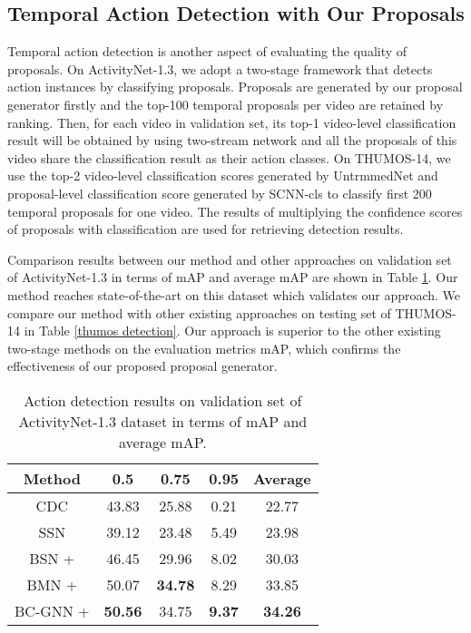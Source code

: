\documentclass[runningheads]{llncs}
\begin{document}
\subsection{Temporal Action Detection with Our Proposals}
Temporal action detection is another aspect of evaluating the quality of proposals. On ActivityNet-1.3, we adopt a two-stage framework that detects action instances by classifying proposals. Proposals are generated by our proposal generator firstly and the top-100 temporal proposals per video are retained by ranking. Then, for each video in validation set, its top-1 video-level classification result will be obtained by using two-stream network \cite{anet_cls} and all the proposals of this video share the classification result as their action classes. On THUMOS-14, we use the top-2 video-level classification scores generated by UntrmmedNet \cite{untrimmednets} and proposal-level classification score generated by SCNN-cls to classify first 200 temporal proposals for one video. The results of multiplying the confidence scores of proposals with classification are used for retrieving detection results.

Comparison results between our method and other approaches on validation set of ActivityNet-1.3 in terms of mAP and average mAP are shown in Table \ref{anet_detection}. Our method reaches state-of-the-art on this dataset which validates our approach. We compare our method with other existing approaches on testing set of THUMOS-14 in Table \ref{thumos detection}. Our approach is superior to the other existing two-stage methods on the evaluation metrics mAP, which confirms the effectiveness of our proposed proposal generator.






\begin{table}
\setlength{\abovecaptionskip}{-.4cm}
\setlength{\belowcaptionskip}{.2cm}
\setlength{\tabcolsep}{2mm}
\caption{Action detection results on validation set of ActivityNet-1.3 dataset in terms of mAP and average
mAP.}
\setlength{\tabcolsep}{6mm}
\begin{center}
\label{anet_detection}
\begin{tabular}{ccccc}
\hline
Method       & 0.5    &  0.75   &  0.95   &  Average        \\ \hline
CDC \cite{CDC}         & 43.83  &    25.88  &    0.21   &    22.77          \\
SSN \cite{SNN}         &  39.12  &    23.48  &   5.49   &     23.98          \\
BSN \cite{BSN} + \cite{anet_cls} &   46.45 &  29.96 &  8.02  &  30.03          \\
BMN \cite{BMN} + \cite{anet_cls} &   50.07          &   \textbf{34.78} &   8.29          &   33.85          \\ \hline
BC-GNN +  \cite{anet_cls} &   \textbf{50.56} &   34.75 &   \textbf{9.37}        &   \textbf{34.26} \\ \hline
\end{tabular}
\end{center}
\end{table}
\end{document}
